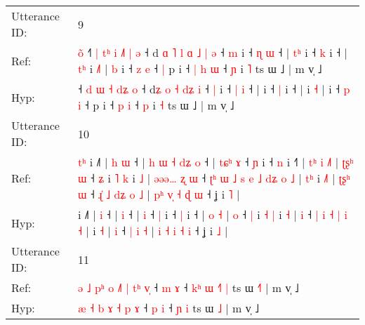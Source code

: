 \documentclass[10pt]{article}
\DeclareRobustCommand{\hl}[1]{{\textcolor{red}{#1}}}
\begin{document}
\begin{longtable}{ll}
 \\
\midrule
Utterance ID: & 9 \\
Ref: & \hl{o}\hl{̃}\hl{ }˧\hl{˥} \hl{|} \hl{t}\hl{ʰ} \hl{i} \hl{˩}\hl{˥}\hl{ }\hl{|} \hl{ə} ˧ d\hl{ }\hl{ɑ}\hl{ }\hl{˥} \hl{l} \hl{ɑ} \hl{˩}\hl{ }\hl{|} \hl{ə} ˧ \hl{m} i ˧ \hl{ɳ} \hl{ɯ} ˧ |\hl{ }\hl{t}\hl{ʰ} i ˧ \hl{k} i ˧ |\hl{ }\hl{t}\hl{ʰ} i \hl{˩}\hl{˥} |\hl{ }\hl{b} i ˧ \hl{z} \hl{e} ˧\hl{ }\hl{|} p i ˧\hl{ }\hl{|} \hl{h} \hl{ɯ} ˧ \hl{ɲ} i \hl{˥} ts ɯ ˩ | m v̩ ˩
 \\
Hyp: & \hl{}\hl{}\hl{}˧\hl{} \hl{d} \hl{}\hl{ɯ} \hl{˧} \hl{}\hl{}\hl{d}\hl{ʑ} \hl{o} ˧ d\hl{}\hl{}\hl{}\hl{ʑ} \hl{o} \hl{˧} \hl{}\hl{d}\hl{ʑ} \hl{i} ˧ \hl{|} i ˧ \hl{|} \hl{i} ˧ |\hl{}\hl{}\hl{} i ˧ \hl{|} i ˧ |\hl{}\hl{}\hl{} i \hl{}\hl{˧} |\hl{}\hl{} i ˧ \hl{p} \hl{i} ˧\hl{}\hl{} p i ˧\hl{}\hl{} \hl{p} \hl{i} ˧ \hl{p} i \hl{˧} ts ɯ ˩ | m v̩ ˩
 \\
\midrule
Utterance ID: & 10 \\
Ref: & \hl{t}\hl{ʰ}\hl{ }i ˩˥ |\hl{ }\hl{h} \hl{ɯ} ˧ |\hl{ }\hl{h}\hl{ }\hl{ɯ}\hl{ }\hl{˧}\hl{ }\hl{d}\hl{ʑ} \hl{o} ˧ |\hl{ }\hl{t}\hl{ɕ}\hl{ʰ} \hl{ɤ} ˧ \hl{ɲ} i ˧ \hl{n} i ˧\hl{˥} |\hl{ }\hl{t}\hl{ʰ} \hl{i} \hl{˩}\hl{˥} |\hl{ }\hl{ʈ}\hl{ʂ}\hl{ʰ} \hl{ɯ} ˧ \hl{ʑ} i \hl{˥} \hl{k} i \hl{˩} |\hl{ }\hl{ə}\hl{ə}\hl{ə}\hl{…}\hl{ }\hl{ʐ} \hl{ɯ} ˧\hl{ }\hl{ʈ}\hl{ʰ}\hl{ }\hl{ɯ}\hl{ }\hl{˩} \hl{s} \hl{e} \hl{˩} \hl{d}\hl{ʑ} \hl{o} \hl{˩} |\hl{ }\hl{t}\hl{ʰ} i \hl{˩}\hl{˥} |\hl{ }\hl{ʈ}\hl{ʂ}\hl{ʰ} \hl{ɯ} ˧\hl{ }\hl{ɻ}\hl{̍}\hl{ }\hl{˩} \hl{d}\hl{ʑ} \hl{o} \hl{˩} | \hl{p}\hl{ʰ} \hl{v}\hl{̩} \hl{˧} \hl{ɖ} \hl{ɯ} ˧ ʝ i \hl{˥} |
 \\
Hyp: & \hl{}\hl{}\hl{}i ˩˥ |\hl{}\hl{} \hl{i} ˧ |\hl{}\hl{}\hl{}\hl{}\hl{}\hl{}\hl{}\hl{}\hl{} \hl{i} ˧ |\hl{}\hl{}\hl{}\hl{} \hl{i} ˧ \hl{|} i ˧ \hl{|} i ˧\hl{} |\hl{}\hl{}\hl{} \hl{o} \hl{}\hl{˧} |\hl{}\hl{}\hl{}\hl{} \hl{o} ˧ \hl{|} i \hl{˧} \hl{|} i \hl{˧} |\hl{}\hl{}\hl{}\hl{}\hl{}\hl{}\hl{} \hl{i} ˧\hl{}\hl{}\hl{}\hl{}\hl{}\hl{}\hl{} \hl{|} \hl{i} \hl{˧} \hl{}\hl{|} \hl{i} \hl{˧} |\hl{}\hl{}\hl{} i \hl{}\hl{˧} |\hl{}\hl{}\hl{}\hl{} \hl{i} ˧\hl{}\hl{}\hl{}\hl{}\hl{} \hl{}\hl{|} \hl{i} \hl{˧} | \hl{}\hl{i} \hl{}\hl{˧} \hl{i} \hl{˧} \hl{i} ˧ ʝ i \hl{˩} |
 \\
\midrule
Utterance ID: & 11 \\
Ref: & \hl{ə}\hl{ }\hl{˩} \hl{p}\hl{ʰ} \hl{o} \hl{˩}\hl{˥} \hl{|} \hl{t}\hl{ʰ} \hl{v}\hl{̩} ˧ \hl{m} \hl{ɤ} ˧\hl{ }\hl{k}\hl{ʰ}\hl{ }\hl{ɯ} \hl{˧}\hl{˥} \hl{|} ts ɯ \hl{˧}\hl{˥} | m v̩ ˩
 \\
Hyp: & \hl{}\hl{}\hl{æ} \hl{}\hl{˧} \hl{b} \hl{}\hl{ɤ} \hl{˧} \hl{}\hl{p} \hl{}\hl{ɤ} ˧ \hl{p} \hl{i} ˧\hl{}\hl{}\hl{}\hl{}\hl{} \hl{}\hl{ɲ} \hl{i} ts ɯ \hl{}\hl{˩} | m v̩ ˩

\end{longtable}
\end{document}

